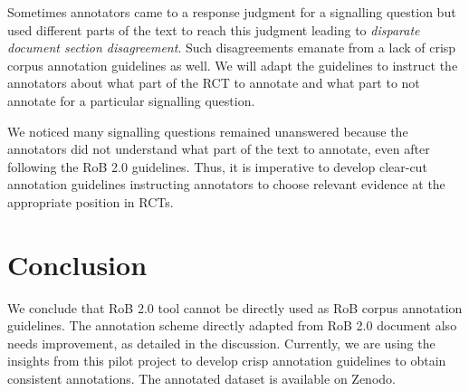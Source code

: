 \documentclass{IOS-Book-Article}
\begin{document}
Sometimes annotators came to a response judgment for a signalling question but used different parts of the text to reach this judgment leading to \textit{disparate document section disagreement}.
Such disagreements emanate from a lack of crisp corpus annotation guidelines as well.
We will adapt the guidelines to instruct the annotators about what part of the RCT to annotate and what part to not annotate for a particular signalling question.


We noticed many signalling questions remained unanswered because the annotators did not understand what part of the text to annotate, even after following the RoB 2.0 guidelines.
Thus, it is imperative to develop clear-cut annotation guidelines instructing annotators to choose relevant evidence at the appropriate position in RCTs.
%
%
%
\section{Conclusion}
\label{sec:conclusion}
%
We conclude that RoB 2.0 tool cannot be directly used as RoB corpus annotation guidelines.
The annotation scheme directly adapted from RoB 2.0 document also needs improvement, as detailed in the discussion.
Currently, we are using the insights from this pilot project to develop crisp annotation guidelines to obtain consistent annotations.
The annotated dataset is available on Zenodo.
%
%
%
 
%
%

%
\end{document}
